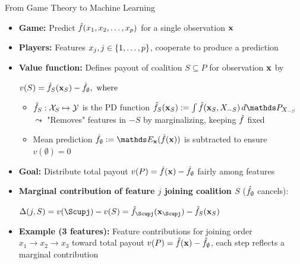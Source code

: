 \documentclass[10pt,compress,t,notes=noshow, xcolor=table]{beamer}
\begin{document}
\begin{frame}{From Game Theory to Machine Learning}
\begin{itemize}%
    \item \textbf{Game:} Predict $\hat{f}(x_1, x_2, \ldots, x_p)$ for a single observation $\mathbf{x}$
    \item \textbf{Players:} Features $x_j, j \in \{1, \ldots, p\}$, cooperate to produce a prediction
    \item \textbf{Value function:} Defines payout of coalition $S \subseteq P$ for observation $\mathbf{x}$ by
    
    \medskip
    \centerline{$v(S) = \hat{f}_{S} (\mathbf{x}_S) - \hat{f}_{\emptyset} , \text{ where }$}
    \medskip
    
    \begin{itemize}
        \item $ \hat{f}_S: \mathcal{X}_S \mapsto \mathcal{Y}$ is the PD function 
  $\fh_S(\xv_S) := \int \fh(\xv_S, X_{-S}) \, d\P_{X_{-S}}$\\
    $\leadsto$ "Removes" features in $-S$ by marginalizing, keeping $\hat{f}$ fixed

    \item Mean prediction $\fh_{ \emptyset} := \E_{\xv}(\fh(\xv))$ is subtracted to ensure $v(\emptyset) = 0$

    \end{itemize}
    
  \item \textbf{Goal:} 
  Distribute total payout $v(P) = \hat{f}(\mathbf{x}) - \hat{f}_\emptyset$ fairly among features%
  \pause
    \item \textbf{Marginal contribution of feature $j$ joining coalition $S$} ($\hat{f}_{ \emptyset}$ cancels):
    
    \medskip
    \centerline{$\Delta(j, S) = v(\Scupj) - v(S) =  \fh_{\Scupj} (\xv_{\Scupj}) - \fh_{S} (\xv_{S})$}
    \medskip
    
        \item %
         \textbf{Example (3 features):} Feature contributions for joining order $x_1 \rightarrow x_2 \rightarrow x_3$ toward total payout $v(P) = \hat{f}(\mathbf{x}) - \hat{f}_\emptyset$, each step reflects a marginal contribution
    \resizebox{\linewidth}{!}{
\begin{tikzpicture}[
  dot/.style = {circle, fill, inner sep=2pt},
  arrow/.style = {-stealth, gray, semithick}
]


\end{tikzpicture}}
\end{itemize}
\end{frame}
\end{document}
